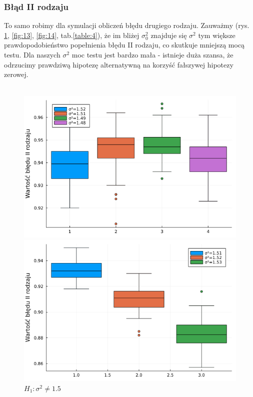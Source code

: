\documentclass{article}
\theoremstyle{break}
\begin{document}
\subsubsection*{Błąd II rodzaju}

To samo robimy dla symulacji obliczeń błędu drugiego rodzaju.  Zauważmy (rys. \ref{fig:12}, \ref{fig:13}, \ref{fig:14}, tab.\ref{table:4}), że im bliżej $\sigma_0^2$ znajduje się $\sigma^2$ tym większe prawdopodobieństwo popełnienia błędu II rodzaju, co skutkuje mniejszą mocą testu. Dla naszych $\sigma^2$ moc testu jest bardzo mała - istnieje duża szansa, że odrzucimy prawdziwą hipotezę alternatywną na korzyść fałszywej hipotezy zerowej. \\
\\

\begin{figure}[H]
\begin{multicols}{3}
		\includegraphics[scale=0.25]{Z3.war1.png}
		\caption{$H_1: \sigma^2\ne1.5$}
		\label{fig:12}
		\includegraphics[scale=0.25]{Z3.war2.png}

\end{multicols}
\end{figure}
\end{document}
